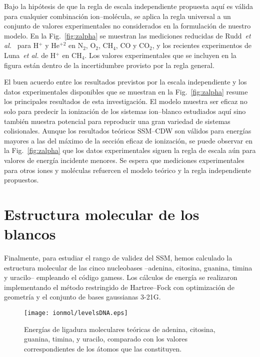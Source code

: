 Bajo la hipótesis de que la regla de escala independiente propuesta aquí 
es válida para cualquier combinación ion--molécula, se aplica la regla 
universal a un conjunto de valores experimentales no considerados en la
formulación de nuestro modelo. En la Fig.~\ref{fig:zalpha} se muestran 
las mediciones reducidas de Rudd~\textit{et al.}~\cite{Rudd:85,Rudd:83} 
para H$^{+}$ y He$^{+2}$ en N$_2$, O$_2$, CH$_4$, CO y CO$_2$, y los 
recientes experimentos de Luna~\textit{et al.} \cite{Luna2019} de 
H$^{+}$ en CH$_4$. Los valores experimentales que se incluyen en la 
figura están dentro de la incertidumbre provisto por la regla general.

El buen acuerdo entre los resultados previstos por la escala 
independiente y los datos experimentales disponibles que se muestran en 
la Fig.~\ref{fig:zalpha} resume los principales resultados de esta 
investigación. El modelo muestra ser eficaz no solo para predecir la 
ionización de los sistemas ion--blanco estudiados aquí sino también 
muestra potencial para reproducir una gran variedad de sistemas 
colisionales. Aunque los resultados teóricos SSM--CDW son válidos para 
energías mayores a las del máximo de la sección eficaz de ionización, 
se puede observar en la Fig.~\ref{fig:zalpha} que los datos 
experimentales siguen la regla de escala aún para valores de energía 
incidente menores. Se espera que mediciones experimentales para otros 
iones y moléculas refuercen el modelo teórico y la regla independiente 
propuestos.

\section{Estructura molecular de los blancos}
\label{sec:molcalculations}

Finalmente, para estudiar el rango de validez del SSM, hemos calculado 
la estructura molecular de las cinco nucleobases --adenina, citosina, 
guanina, timina y uracilo-- empleando el código {\sc gamess}. Los 
cálculos de energía se realizaron implementando el método restringido de 
Hartree--Fock con optimización de geometría y el conjunto de bases 
gaussianas 3-21G. 

\begin{figure}[t]
\centering
\texttt{[image: ionmol/levelsDNA.eps]}
\caption[Energías de ligadura moleculares teóricas de ADN y ARN.]
{Energías de ligadura moleculares teóricas de adenina, citosina, 
guanina, timina, y uracilo, comparado con los valores correspondientes 
de los átomos que las constituyen.}
\label{fig:bindener}
\end{figure}

